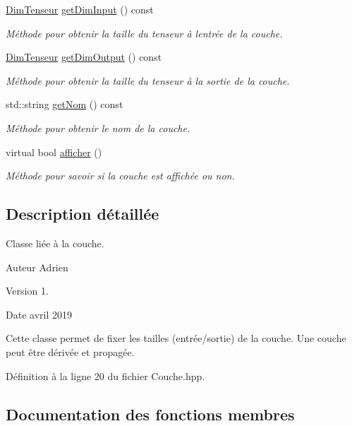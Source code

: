 \begin{DoxyCompactItemize}
\hyperlink{class_dim_tenseur}{Dim\+Tenseur} \hyperlink{class_couche_a4f3e4fe4a84f2dfcbee4bda6e20bdc03}{get\+Dim\+Input} () const
\begin{DoxyCompactList}\small\item\em Méthode pour obtenir la taille du tenseur à l\textquotesingle{}entrée de la couche. \end{DoxyCompactList}\item 
\hyperlink{class_dim_tenseur}{Dim\+Tenseur} \hyperlink{class_couche_ae8c80adf3a53da0d975e6f1148d0cea9}{get\+Dim\+Output} () const
\begin{DoxyCompactList}\small\item\em Méthode pour obtenir la taille du tenseur à la sortie de la couche. \end{DoxyCompactList}\item 
std\+::string \hyperlink{class_couche_a367bb58eaafab2b5fe635e6d3350fe4b}{get\+Nom} () const
\begin{DoxyCompactList}\small\item\em Méthode pour obtenir le nom de la couche. \end{DoxyCompactList}\item 
virtual bool \hyperlink{class_couche_a3c76d2c7a0adf864dc6f3f5fbf2c7563}{afficher} ()
\begin{DoxyCompactList}\small\item\em Méthode pour savoir si la couche est affichée ou non. \end{DoxyCompactList}\end{DoxyCompactItemize}


\subsection{Description détaillée}
Classe liée à la couche. 

\begin{DoxyAuthor}{Auteur}
Adrien 
\end{DoxyAuthor}
\begin{DoxyVersion}{Version}
1. 
\end{DoxyVersion}
\begin{DoxyDate}{Date}
avril 2019
\end{DoxyDate}
Cette classe permet de fixer les tailles (entrée/sortie) de la couche. Une couche peut être dérivée et propagée. 

Définition à la ligne 20 du fichier Couche.\+hpp.



\subsection{Documentation des fonctions membres}
\mbox{\label{class_couche_a3c76d2c7a0adf864dc6f3f5fbf2c7563}} 
